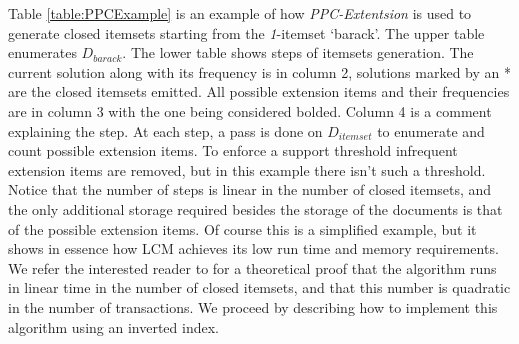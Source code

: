 \documentclass{sig-alternate}
\begin{document}


Table \ref{table:PPCExample} is an example of how \emph{PPC-Extentsion} is used to generate closed itemsets starting from the  \emph{1}-itemset `barack'. The upper table enumerates $D_{barack}$. %
The lower table shows steps of itemsets generation. The current solution along with its frequency is in column 2, solutions marked by an * are the closed itemsets emitted. All possible extension items and their frequencies are in column 3 with the one being considered bolded. Column 4 is a comment explaining the step. At each step, a pass is done on $D_{itemset}$ to enumerate and count possible extension items.
To enforce a support threshold infrequent extension items are removed, but in this example there isn't such a threshold. Notice that the number of steps is linear in the number of closed itemsets, and the only additional storage required besides the storage of the documents is that of the possible extension items. Of course this is a simplified example, but it shows in essence how LCM achieves its low run time and memory requirements. We refer the interested reader to \cite{lcm} for a theoretical proof that the algorithm runs in linear time in the number of closed itemsets, and that this number is quadratic in the number of transactions. We proceed by describing how to implement this algorithm using an inverted index.

\end{document}

